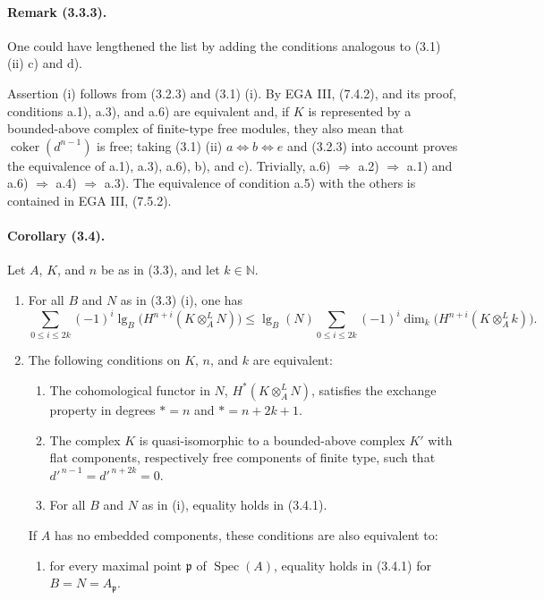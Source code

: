 \documentclass[10pt]{article}
\providecommand{\N}{\mathbb N}
\providecommand{\Spec}{\operatorname{Spec}}
\providecommand{\lgop}{\operatorname{lg}}
\providecommand{\coker}{\operatorname{coker}}
\begin{document}
\paragraph{Remark (3.3.3).} One could have lengthened the list by adding the conditions analogous to (3.1) (ii) c) and d).

Assertion (i) follows from (3.2.3) and (3.1) (i). By EGA III, (7.4.2), and its proof, conditions a.1), a.3), and a.6) are equivalent and, if $K$ is represented by a bounded-above complex of finite-type free modules, they also mean that $\coker(d^{n-1})$ is free; taking (3.1) (ii) $a\Leftrightarrow b\Leftrightarrow e$ and (3.2.3) into account proves the equivalence of a.1), a.3), a.6), b), and c). Trivially, a.6) $\Rightarrow$ a.2) $\Rightarrow$ a.1) and a.6) $\Rightarrow$ a.4) $\Rightarrow$ a.3). The equivalence of condition a.5) with the others is contained in EGA III, (7.5.2).

\paragraph{Corollary (3.4).} Let $A$, $K$, and $n$ be as in (3.3), and let $k\in\N$.
\begin{enumerate}[label=(\roman*)]
\item For all $B$ and $N$ as in (3.3) (i), one has
\[
\tag{3.4.1}
\sum_{0\le i\le 2k}(-1)^i\lgop_B\bigl(H^{n+i}(K\otimes_A^L N)\bigr)
\le
\lgop_B(N)\sum_{0\le i\le 2k}(-1)^i\dim_k\bigl(H^{n+i}(K\otimes_A^L k)\bigr).
\]
\item The following conditions on $K$, $n$, and $k$ are equivalent:
\begin{enumerate}[label=\alph*)]
\item The cohomological functor in $N$, $H^*(K\otimes_A^L N)$, satisfies the exchange property in degrees $*=n$ and $*=n+2k+1$.
\item[\textup{a'}] The complex $K$ is quasi-isomorphic to a bounded-above complex $K'$ with flat components, respectively free components of finite type, such that $d'^{\,n-1}=d'^{\,n+2k}=0$.
\item For all $B$ and $N$ as in (i), equality holds in (3.4.1).
\end{enumerate}
If $A$ has no embedded components, these conditions are also equivalent to:
\begin{enumerate}[label=\alph*),start=3]
\item for every maximal point $\mathfrak p$ of $\Spec(A)$, equality holds in (3.4.1) for $B=N=A_\mathfrak p$.
\end{enumerate}
\end{enumerate}
\end{document}
